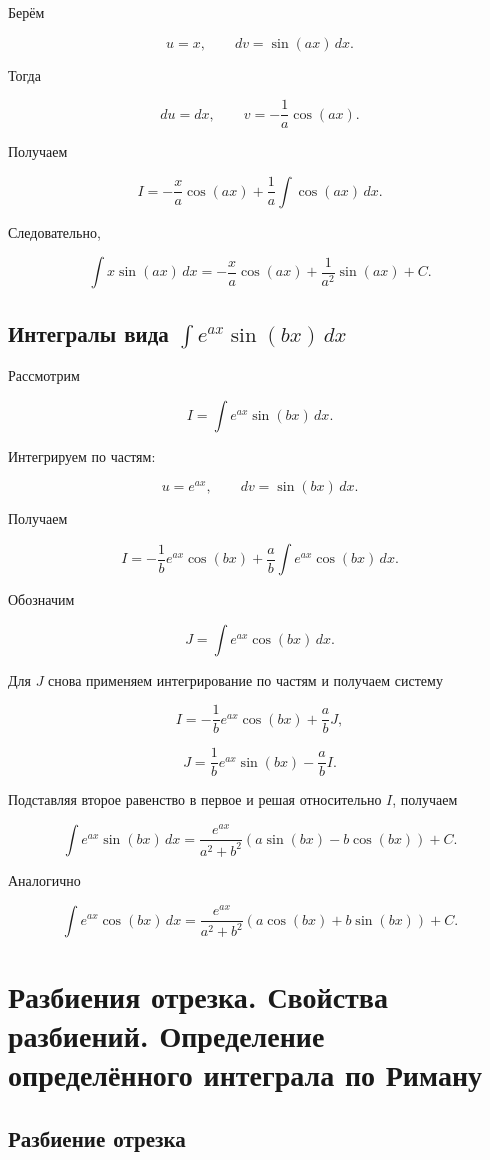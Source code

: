 \documentclass[14pt]{extreport}
\begin{document}
Берём

\[
u=x,
\qquad
dv=\sin(ax)\,dx.
\]

Тогда

\[
du=dx,
\qquad
v=-\frac1a\cos(ax).
\]

Получаем

\[
I
=
-\frac{x}{a}\cos(ax)
+
\frac1a
\int \cos(ax)\,dx.
\]

Следовательно,

\[
\boxed{
\int x\sin(ax)\,dx
=
-\frac{x}{a}\cos(ax)
+\frac1{a^2}\sin(ax)
+C.
}
\]

\section{Интегралы вида
$\int e^{ax}\sin(bx)\,dx$}

Рассмотрим

\[
I=\int e^{ax}\sin(bx)\,dx.
\]

Интегрируем по частям:

\[
u=e^{ax},
\qquad
dv=\sin(bx)\,dx.
\]

Получаем

\[
I
=
-\frac1b e^{ax}\cos(bx)
+
\frac ab
\int e^{ax}\cos(bx)\,dx.
\]

Обозначим

\[
J=\int e^{ax}\cos(bx)\,dx.
\]

Для $J$ снова применяем интегрирование по частям и получаем систему

\[
I
=
-\frac1b e^{ax}\cos(bx)
+
\frac ab J,
\]

\[
J
=
\frac1b e^{ax}\sin(bx)
-
\frac ab I.
\]

Подставляя второе равенство в первое и решая относительно $I$,
получаем

\[
\boxed{
\int e^{ax}\sin(bx)\,dx
=
\frac{e^{ax}}
     {a^2+b^2}
\left(
a\sin(bx)-b\cos(bx)
\right)
+C.
}
\]

Аналогично

\[
\boxed{
\int e^{ax}\cos(bx)\,dx
=
\frac{e^{ax}}
     {a^2+b^2}
\left(
a\cos(bx)+b\sin(bx)
\right)
+C.
}
\]

\chapter{Разбиения отрезка. Свойства разбиений.
Определение определённого интеграла по Риману}

\section{Разбиение отрезка}
\end{document}
